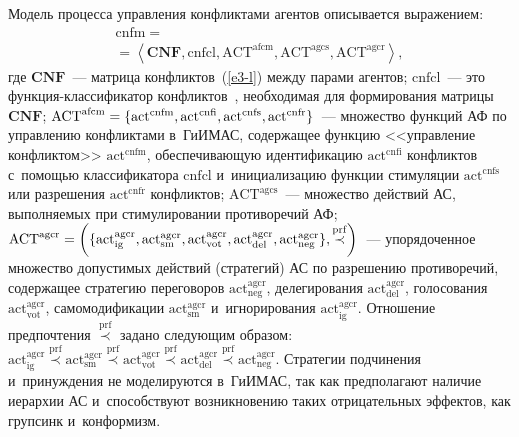 \begin{multicols}{2}
  Модель процесса управления конфликтами агентов описывается выражением:
  \begin{multline}
 \mathrm{cnfm} ={}\\
\!\!{}=\left\langle \mathbf{CNF}, \mathrm{cnfcl}, \mathrm{ACT^{afcm}}, 
\mathrm{ACT}^{\mathrm{agcs}}, \mathrm{ACT}^{\mathrm{agcr}}\right\rangle,\!\!\!
  \label{e2-l}
  \end{multline}
где $\mathbf{CNF}$~--- мат\-ри\-ца конфликтов~(\ref{e3-l}) между парами 
агентов; $\mathrm{cnfcl}$~--- это функ\-ция-клас\-си\-фи\-ка\-тор конфликтов~\cite{4-l}, 
необходимая для формирования мат\-ри\-цы~$\mathbf{CNF}$; 
$\mathrm{ACT}^{\mathrm{afcm}}\hm= \{ \mathrm{act}^{\mathrm{cnfm}},\linebreak \mathrm{act}^{\mathrm{cnfi}}, 
\mathrm{act}^{\mathrm{cnfs}}, 
\mathrm{act}^{\mathrm{cnfr}}\}$~--- множество функций АФ по управ\-ле\-нию конфликтами 
в~\mbox{ГиИМАС}, содержащее функцию <<управ\-ле\-ние конфликтом>> 
$\mathrm{act}^{\mathrm{cnfm}}$, обеспечивающую идентификацию $\mathrm{act^{cnfi}}$ конфликтов 
с~по\-мощью классификатора $\mathrm{cnfcl}$ и~инициа\-ли\-за\-цию функции стимуляции 
$\mathrm{act^{cnfs}}$ или разрешения $\mathrm{act^{cnfr}}$ конфликтов; 
$\mathrm{ACT}^{\mathrm{agcs}}$~--- \mbox{множество} действий АС, выполняемых при 
стимулировании противоречий АФ; $\mathrm{ACT}^{\mathrm{agcr}}\hm= \left( \{ 
\mathrm{act}_{\mathrm{ig}}^{\mathrm{agcr}}, 
\mathrm{act}_{\mathrm{sm}}^{\mathrm{agcr}}, \mathrm{act}_{\mathrm{vot}}^{\mathrm{agcr}}, 
\mathrm{act}_{\mathrm{del}}^{\mathrm{agcr}}, 
\mathrm{act}_{\mathrm{neg}}^{\mathrm{agcr}}\}, \overset{\mathrm{prf}}{\prec}\right)$~---
 упорядоченное множество 
допустимых действий (стратегий) АС по разрешению противоречий,\linebreak 
содержащее стратегию переговоров $\mathrm{act}^{\mathrm{agcr}}_{\mathrm{neg}}$, делегирования 
$\mathrm{act}_{\mathrm{del}}^{\mathrm{agcr}}$, голосования 
$\mathrm{act}_{\mathrm{vot}}^{\mathrm{agcr}}$, самомодификации 
$\mathrm{act}_{\mathrm{sm}}^{\mathrm{agcr}}$ и~игнорирования 
$\mathrm{act}_{\mathrm{ig}}^{\mathrm{agcr}}$. Отношение предпочтения 
$\overset{\mathrm{prf}}{\prec}$ задано сле\-ду\-ющим образом: $\mathrm{act}_{\mathrm{ig}}^{\mathrm{agcr}} 
\overset{\mathrm{prf}}{\prec} \mathrm{act}_{\mathrm{sm}}^{\mathrm{agcr}} 
\overset{\mathrm{prf}}{\prec} \mathrm{act}_{\mathrm{vot}}^{\mathrm{agcr}} 
\overset{\mathrm{prf}}{\prec} \mathrm{act}_{\mathrm{del}}^{\mathrm{agcr}}
\overset{\mathrm{prf}}{\prec} \mathrm{act}_{\mathrm{neg}}^{\mathrm{agcr}}$. 
Стратегии подчинения и~принуждения не моделируются в~\mbox{ГиИМАС}, так как 
предполагают наличие иерархии АС и~способствуют возникновению таких 
отрицательных эффектов, как груп\-синк и~конформизм.


\end{multicols}
